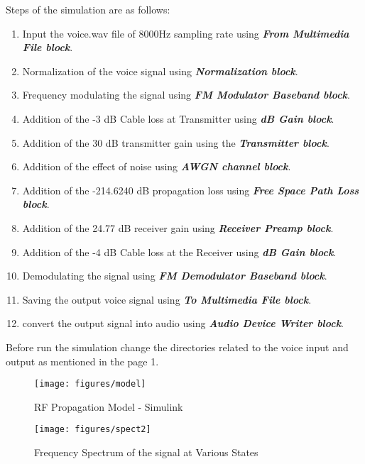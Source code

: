 \documentclass[a4paper,11pt]{article}%
\begin{document}
Steps of the simulation are as follows:
\begin{enumerate}[1.]
	\item Input the voice.wav file of 8000Hz sampling rate using \textbf{\textit{From Multimedia File block}}.
	\item Normalization of the voice signal using \textbf{\textit{Normalization block}}.
	\item Frequency modulating the signal using \textbf{\textit{FM Modulator Baseband block}}.
	\item Addition of the -3 dB Cable loss at Transmitter using \textbf{\textit{dB Gain block}}.
	\item Addition of the 30 dB transmitter gain using the \textbf{\textit{Transmitter block}}.
	\item Addition of the effect of noise using \textbf{\textit{AWGN channel block}}.
	\item Addition of the -214.6240 dB propagation loss using \textbf{\textit{Free Space Path Loss block}}.
	\item Addition of the 24.77 dB receiver gain using  \textbf{\textit{Receiver Preamp block}}.
	\item Addition of the -4 dB Cable loss at the Receiver using \textbf{\textit{dB Gain block}}.
	\item Demodulating the signal using \textbf{\textit{FM Demodulator Baseband block}}.
	\item Saving the output voice signal using \textbf{\textit{To Multimedia File block}}.
	\item convert the output signal into audio using \textbf{\textit{Audio Device Writer block}}.
\end{enumerate}
\vspace{1cm}
Before run the simulation change the directories related to the voice input and output as mentioned in the page 1.


\begin{figure}[!h]
	\centering
	\texttt{[image: figures/model]} %
	\caption{RF Propagation Model - Simulink}
\end{figure}
\vspace{1.5cm}

\begin{figure}[!h]
	\centering
	\texttt{[image: figures/spect2]}
	\caption{Frequency Spectrum of the signal at Various States}
\end{figure}
\end{document}
